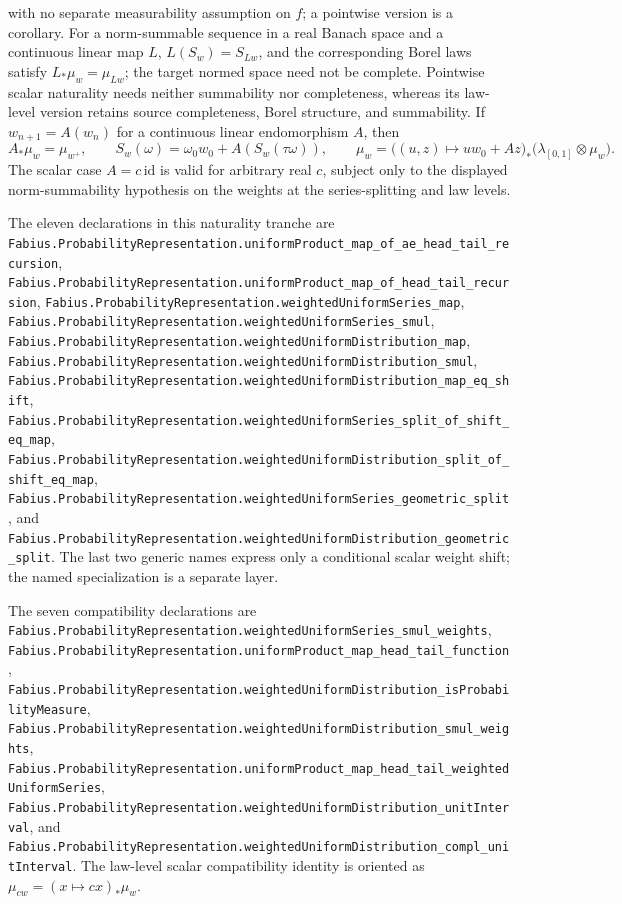 \documentclass[11pt,oneside]{article}
\theoremstyle{definition}
\theoremstyle{remark}
\newcommand{\1}{\mathbf 1}
\begin{document}
\begin{statusbox}
with no separate measurability assumption on \(f\); a pointwise version is a corollary.
For a norm-summable sequence in a real Banach space and a continuous linear map \(L\),
\(L(S_w)=S_{Lw}\), and the corresponding Borel laws satisfy \(L_*\mu_w=\mu_{Lw}\);
the target normed space need not be complete.  Pointwise scalar naturality needs neither
summability nor completeness, whereas its law-level version retains source completeness,
Borel structure, and summability.  If \(w_{n+1}=A(w_n)\) for a continuous linear
endomorphism \(A\), then
\[
 A_*\mu_w=\mu_{w^+},\qquad
 S_w(\omega)=\omega_0w_0+A(S_w(\tau\omega)),\qquad
 \mu_w=\bigl((u,z)\mapsto u w_0+A z\bigr)_*
   \bigl(\lambda_{[0,1]}\otimes\mu_w\bigr).
\]
The scalar case \(A=c\,\mathrm{id}\) is valid for arbitrary real \(c\), subject only to
the displayed norm-summability hypothesis on the weights at the series-splitting and law
levels.

The eleven declarations in this naturality tranche are
\nolinkurl{Fabius.ProbabilityRepresentation.uniformProduct_map_of_ae_head_tail_recursion},
\nolinkurl{Fabius.ProbabilityRepresentation.uniformProduct_map_of_head_tail_recursion},
\nolinkurl{Fabius.ProbabilityRepresentation.weightedUniformSeries_map},
\nolinkurl{Fabius.ProbabilityRepresentation.weightedUniformSeries_smul},
\nolinkurl{Fabius.ProbabilityRepresentation.weightedUniformDistribution_map},
\nolinkurl{Fabius.ProbabilityRepresentation.weightedUniformDistribution_smul},
\nolinkurl{Fabius.ProbabilityRepresentation.weightedUniformDistribution_map_eq_shift},
\nolinkurl{Fabius.ProbabilityRepresentation.weightedUniformSeries_split_of_shift_eq_map},
\nolinkurl{Fabius.ProbabilityRepresentation.weightedUniformDistribution_split_of_shift_eq_map},
\nolinkurl{Fabius.ProbabilityRepresentation.weightedUniformSeries_geometric_split}, and
\nolinkurl{Fabius.ProbabilityRepresentation.weightedUniformDistribution_geometric_split}.
The last two generic names express only a conditional scalar weight shift; the named
specialization is a separate layer.

The seven compatibility declarations are
\nolinkurl{Fabius.ProbabilityRepresentation.weightedUniformSeries_smul_weights},
\nolinkurl{Fabius.ProbabilityRepresentation.uniformProduct_map_head_tail_function},
\nolinkurl{Fabius.ProbabilityRepresentation.weightedUniformDistribution_isProbabilityMeasure},
\nolinkurl{Fabius.ProbabilityRepresentation.weightedUniformDistribution_smul_weights},
\nolinkurl{Fabius.ProbabilityRepresentation.uniformProduct_map_head_tail_weightedUniformSeries},
\nolinkurl{Fabius.ProbabilityRepresentation.weightedUniformDistribution_unitInterval}, and
\nolinkurl{Fabius.ProbabilityRepresentation.weightedUniformDistribution_compl_unitInterval}.
The law-level scalar compatibility identity is oriented as
\(\mu_{cw}=(x\mapsto cx)_*\mu_w\).


\end{statusbox}
\end{document}
